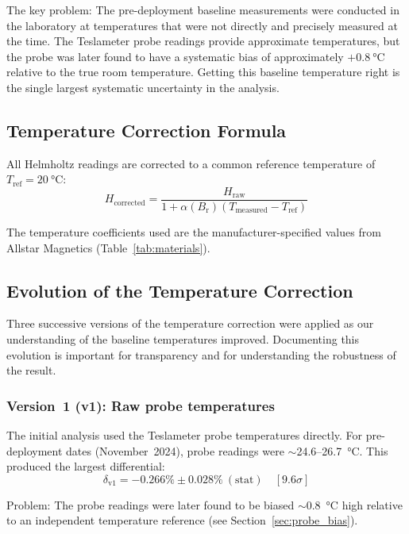 \documentclass[11pt,letterpaper]{article}
\newcommand{\Br}{B_\mathrm{r}}
\newcommand{\alphar}{\alpha(\Br)}
\begin{document}
The key problem: The pre-deployment baseline measurements were
conducted in the laboratory at temperatures that were not directly and
precisely measured at the time. The Teslameter probe readings provide
approximate temperatures, but the probe was later found to have a systematic
bias of approximately $+\SI{0.8}{\celsius}$ relative to the true room
temperature. Getting this baseline temperature right is the single largest
systematic uncertainty in the analysis.

\subsection{Temperature Correction Formula}

All Helmholtz readings are corrected to a common reference temperature of
$T_\mathrm{ref} = \SI{20}{\celsius}$:
\begin{equation}
    H_\mathrm{corrected} = \frac{H_\mathrm{raw}}{1 + \alphar (T_\mathrm{measured} - T_\mathrm{ref})}
    \label{eq:temp_correction}
\end{equation}

The temperature coefficients used are the manufacturer-specified values from
Allstar Magnetics (Table~\ref{tab:materials}).

\subsection{Evolution of the Temperature Correction}
\label{sec:temp_history}

Three successive versions of the temperature correction were applied as our
understanding of the baseline temperatures improved. Documenting this evolution
is important for transparency and for understanding the robustness of the
result.

\subsubsection{Version~1 (v1): Raw probe temperatures}

The initial analysis used the Teslameter probe temperatures directly. For
pre-deployment dates (November~2024), probe readings were $\sim$24.6--\SI{26.7}{\celsius}. This
produced the largest differential:
\begin{equation*}
    \delta_\mathrm{v1} = -0.266\% \pm 0.028\%~(\mathrm{stat}) \quad [9.6\sigma]
\end{equation*}

Problem: The probe readings were later found to be biased
$\sim$\SI{0.8}{\celsius} high relative to an independent temperature reference
(see Section~\ref{sec:probe_bias}).
\end{document}
